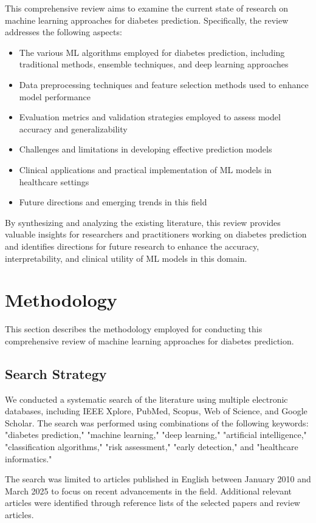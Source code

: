 \documentclass[journal]{IEEEtran}
\begin{document}
This comprehensive review aims to examine the current state of research on machine learning approaches for diabetes prediction. Specifically, the review addresses the following aspects:

\begin{itemize}
    \item The various ML algorithms employed for diabetes prediction, including traditional methods, ensemble techniques, and deep learning approaches
    \item Data preprocessing techniques and feature selection methods used to enhance model performance
    \item Evaluation metrics and validation strategies employed to assess model accuracy and generalizability
    \item Challenges and limitations in developing effective prediction models
    \item Clinical applications and practical implementation of ML models in healthcare settings
    \item Future directions and emerging trends in this field
\end{itemize}

By synthesizing and analyzing the existing literature, this review provides valuable insights for researchers and practitioners working on diabetes prediction and identifies directions for future research to enhance the accuracy, interpretability, and clinical utility of ML models in this domain.

\section{Methodology}
This section describes the methodology employed for conducting this comprehensive review of machine learning approaches for diabetes prediction.

\subsection{Search Strategy}
We conducted a systematic search of the literature using multiple electronic databases, including IEEE Xplore, PubMed, Scopus, Web of Science, and Google Scholar. The search was performed using combinations of the following keywords: "diabetes prediction," "machine learning," "deep learning," "artificial intelligence," "classification algorithms," "risk assessment," "early detection," and "healthcare informatics."

The search was limited to articles published in English between January 2010 and March 2025 to focus on recent advancements in the field. Additional relevant articles were identified through reference lists of the selected papers and review articles.
\end{document}
